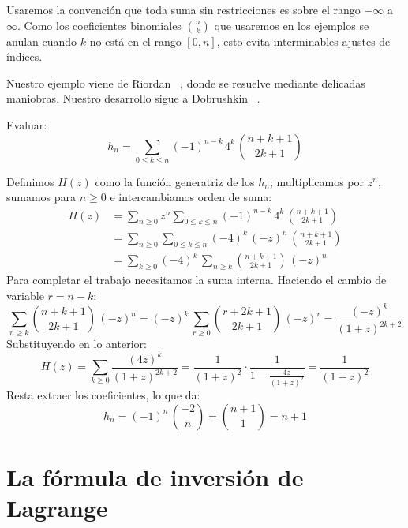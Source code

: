   Usaremos la convención que toda suma sin restricciones
  es sobre el rango \(-\infty\) a \(\infty\).
  Como los coeficientes binomiales \(\binom{n}{k}\)
  que usaremos en los ejemplos se anulan cuando
  \(k\) no está en el rango \([0, n]\),
  esto evita interminables ajustes de índices.

  Nuestro ejemplo viene de Riordan~%
    \cite{riordan68:_combin_ident},
  donde se resuelve mediante delicadas maniobras.
  Nuestro desarrollo sigue a Dobrushkin~%
    \cite{dobrushkin10:_method_algor_analysis}.

  Evaluar:
  \begin{equation*}
    h_n
      = \sum_{0 \le k \le n}
          (-1)^{n - k} \, 4^k \, \binom{n + k + 1}{2 k + 1}
  \end{equation*}

  Definimos \(H(z)\) como la función generatriz de los \(h_n\);
  multiplicamos por \(z^n\),
  sumamos para \(n \ge 0\)
  e intercambiamos orden de suma:
  \begin{align*}
    H(z)
      &= \sum_{n \ge 0} z^n
           \sum_{0 \le k \le n}
             (-1)^{n - k} \, 4^k \, \binom{n + k + 1}{2 k + 1} \\
      &= \sum_{n \ge 0}
           \sum_{0 \le k \le n}
             (-4)^k \, (-z)^n \, \binom{n + k + 1}{2 k + 1} \\
      &= \sum_{k \ge 0}
           (-4)^k \,
           \sum_{n \ge k}
             \binom{n + k + 1}{2 k + 1} \, (-z)^n
  \end{align*}
  Para completar el trabajo necesitamos la suma interna.
  Haciendo el cambio de variable \(r = n - k\):
  \begin{equation*}
    \sum_{n \ge k} \binom{n + k + 1}{2 k + 1} \, (-z)^n
      = (-z)^k \, \sum_{r \ge 0}
                    \binom{r + 2 k + 1}{2 k + 1} \, (-z)^r
      = \frac{(-z)^k}{(1 + z)^{2 k + 2}}
  \end{equation*}
  Substituyendo en lo anterior:
  \begin{equation*}
    H(z)
      = \sum_{k \ge 0} \frac{(4 z)^k}{(1 + z)^{2 k + 2}}
      = \frac{1}{(1 + z)^2}
          \cdot \frac{1}{1 - \frac{4 z}{(1 + z)^2}}
      = \frac{1}{(1 - z)^2}
  \end{equation*}
  Resta extraer los coeficientes,
  lo que da:
  \begin{equation*}
    h_n
      = (-1)^n \, \binom{-2}{n}
      = \binom{n + 1}{1}
      = n + 1
  \end{equation*}

\section{La fórmula de inversión de Lagrange}
\label{sec:Lagrange-inversion}


